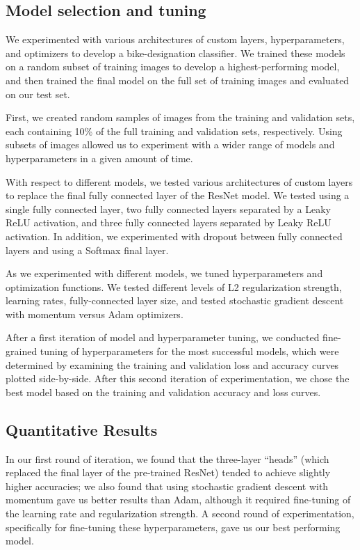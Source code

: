 \documentclass[10pt,twocolumn,letterpaper]{article}
\begin{document}
\subsection{Model selection and tuning}

We experimented with various architectures of custom layers, hyperparameters, and optimizers to develop a bike-designation classifier. We trained these models on a random subset of training images to develop a highest-performing model, and then trained the final model on the full set of training images and evaluated on our test set.

First, we created random samples of images from the training and validation sets, each containing 10\% of the full training and validation sets, respectively. Using subsets of images allowed us to experiment with a wider range of models and hyperparameters in a given amount of time.

With respect to different models, we tested various architectures of custom layers to replace the final fully connected layer of the ResNet model. We tested using a single fully connected layer, two fully connected layers separated by a Leaky ReLU activation, and three fully connected layers separated by Leaky ReLU activation. In addition, we experimented with dropout between fully connected layers and using a Softmax final layer. 

As we experimented with different models, we tuned hyperparameters and optimization functions. We tested different levels of L2 regularization strength, learning rates, fully-connected layer size, and tested stochastic gradient descent with momentum versus Adam optimizers. 

After a first iteration of model and hyperparameter tuning, we conducted fine-grained tuning of hyperparameters for the most successful models, which were determined by examining the training and validation loss and accuracy curves plotted side-by-side. After this second iteration of experimentation, we chose the best model based on the training and validation accuracy and loss curves. 

\subsection{Quantitative Results}
\label{sec:quantitative}

In our first round of iteration, we found that the three-layer ``heads'' (which replaced the final layer of the pre-trained ResNet) tended to achieve slightly higher accuracies; we also found that using stochastic gradient descent with momentum gave us better results than Adam, although it required fine-tuning of the learning rate and regularization strength. A second round of experimentation, specifically for fine-tuning these hyperparameters, gave us our best performing model. 
\end{document}
